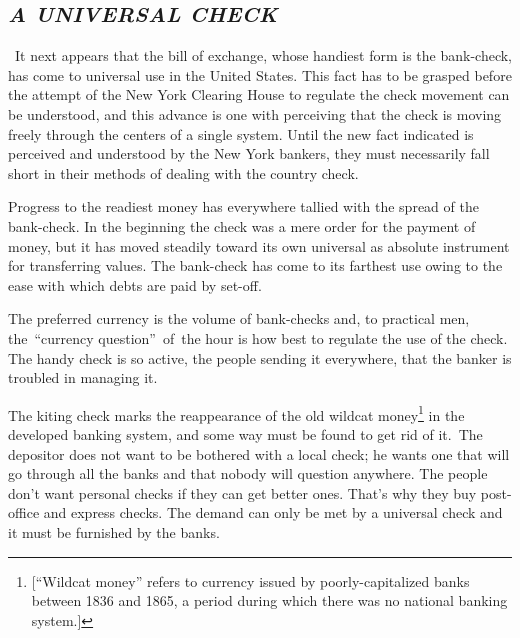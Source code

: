 \documentclass[twoside,symmetric,nobib,justified]{tufte-book}
\begin{document}
\enlargethispage{\baselineskip}

\hypertarget{a-universal-check}{%
\subsection{\texorpdfstring{\emph{A UNIVERSAL
CHECK}}{A UNIVERSAL CHECK}}\label{a-universal-check}}

~It next appears that the bill of exchange, whose handiest form is the
bank-check, has come to universal use in the United States. This fact
has to be grasped before the attempt of the New York Clearing House to
regulate the check movement can be understood, and this advance is one
with perceiving that the check is moving freely through the centers of a
single system. Until the new fact indicated is perceived and understood
by the New York bankers, they must necessarily fall short in their
methods of dealing with the country check.~

Progress to the readiest money has everywhere tallied with the spread of
the bank-check. In the beginning the check was a mere order for the
payment of money, but it has moved steadily toward its own universal as
absolute instrument for transferring values. The bank-check has come to
its farthest use owing to the ease with which debts are paid by
set-off.~

The preferred currency is the volume of bank-checks and, to practical
men, the~``currency question''~of~the hour is how best to regulate the
use of the check. The handy check is so active, the people sending it
everywhere, that the banker is troubled in managing it.~

The kiting check marks the reappearance of the old wildcat
money\footnote{{[}``Wildcat money'' refers to currency issued by
  poorly-capitalized banks between 1836 and 1865, a period during which
  there was no national banking system.{]}} in the developed banking
system, and some way must be found to get rid of it.~The depositor does
not want to be bothered with a local check; he wants one that will go
through all the banks and that nobody will question anywhere. The people
don't want personal checks if they can get better ones. That's why they
buy post-office and express checks. The demand can only be met by a
universal check and it must be furnished by the banks. ~

\enlargethispage{\baselineskip}
\end{document}
